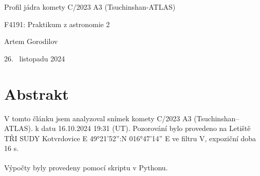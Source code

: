 \documentclass[a4paper,11pt]{article}
\begin{document}
\hline
\begin{center}
\bigskip
\huge Profil jádra komety C/2023 A3 (Tsuchinshan-ATLAS)
\vspace{0.5cm}
\par \large F4191: Praktikum z astronomie 2
\par \large Artem Gorodilov
\vspace{0.5cm}
\par \large 26. ~listopadu 2024
\bigskip
\end{center}
\hline
\bigskip


\vskip10pt
    \begin{minipage}[t]{0.5\textwidth} 
        \section{Abstrakt}    
        V tomto článku jsem analyzoval snímek komety C/2023 A3 (Tsuchinshan–ATLAS). k datu 16.10.2024 19:31 (UT). Pozorování bylo provedeno na Letiště TŘI SUDY Kotvrdovice E 49°21'52'':N 016°47'14'' E ve filtru V, expoziční doba 16 s.
            \par Výpočty byly provedeny pomocí skriptu v Pythonu\textsuperscript{\cite{github}}.


\end{minipage}
\end{document}
